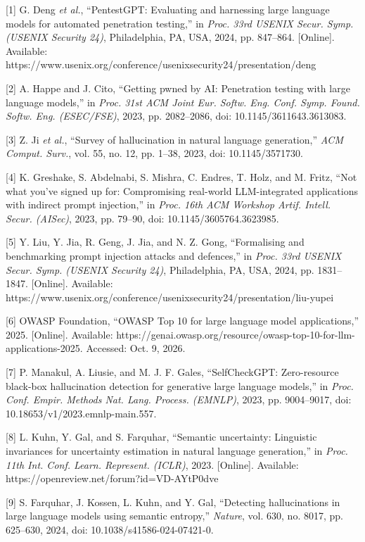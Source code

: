 \documentclass[
]{article}
\begin{document}
{[}1{]} G. Deng \emph{et al.}, ``PentestGPT: Evaluating and harnessing
large language models for automated penetration testing,'' in
\emph{Proc. 33rd USENIX Secur. Symp. (USENIX Security 24)},
Philadelphia, PA, USA, 2024, pp. 847--864. {[}Online{]}. Available:
https://www.usenix.org/conference/usenixsecurity24/presentation/deng

{[}2{]} A. Happe and J. Cito, ``Getting pwned by AI: Penetration testing
with large language models,'' in \emph{Proc. 31st ACM Joint Eur. Softw.
Eng. Conf. Symp. Found. Softw. Eng. (ESEC/FSE)}, 2023, pp. 2082--2086,
doi: 10.1145/3611643.3613083.

{[}3{]} Z. Ji \emph{et al.}, ``Survey of hallucination in natural
language generation,'' \emph{ACM Comput. Surv.}, vol. 55, no. 12, pp.
1--38, 2023, doi: 10.1145/3571730.

{[}4{]} K. Greshake, S. Abdelnabi, S. Mishra, C. Endres, T. Holz, and M.
Fritz, ``Not what you've signed up for: Compromising real-world
LLM-integrated applications with indirect prompt injection,'' in
\emph{Proc. 16th ACM Workshop Artif. Intell. Secur. (AISec)}, 2023, pp.
79--90, doi: 10.1145/3605764.3623985.

{[}5{]} Y. Liu, Y. Jia, R. Geng, J. Jia, and N. Z. Gong, ``Formalising
and benchmarking prompt injection attacks and defences,'' in \emph{Proc.
33rd USENIX Secur. Symp. (USENIX Security 24)}, Philadelphia, PA, USA,
2024, pp. 1831--1847. {[}Online{]}. Available:
https://www.usenix.org/conference/usenixsecurity24/presentation/liu-yupei

{[}6{]} OWASP Foundation, ``OWASP Top 10 for large language model
applications,'' 2025. {[}Online{]}. Available:
https://genai.owasp.org/resource/owasp-top-10-for-llm-applications-2025.
Accessed: Oct. 9, 2026.

{[}7{]} P. Manakul, A. Liusie, and M. J. F. Gales, ``SelfCheckGPT:
Zero-resource black-box hallucination detection for generative large
language models,'' in \emph{Proc. Conf. Empir. Methods Nat. Lang.
Process. (EMNLP)}, 2023, pp. 9004--9017, doi:
10.18653/v1/2023.emnlp-main.557.

{[}8{]} L. Kuhn, Y. Gal, and S. Farquhar, ``Semantic uncertainty:
Linguistic invariances for uncertainty estimation in natural language
generation,'' in \emph{Proc. 11th Int. Conf. Learn. Represent. (ICLR)},
2023. {[}Online{]}. Available:
https://openreview.net/forum?id=VD-AYtP0dve

{[}9{]} S. Farquhar, J. Kossen, L. Kuhn, and Y. Gal, ``Detecting
hallucinations in large language models using semantic entropy,''
\emph{Nature}, vol. 630, no. 8017, pp. 625--630, 2024, doi:
10.1038/s41586-024-07421-0.
\end{document}
